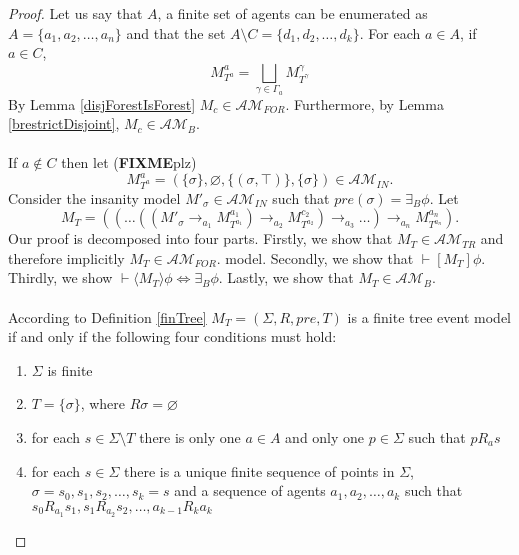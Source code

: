 \documentclass[12pt, a4paper, titlepage]{article}
\numberwithin{equation}{section}
\newcommand{\sqex}[1]{[{#1}]}
\newcommand{\anex}[1]{\langle {#1} \rangle}
\newcommand{\eventClass}{\mathcal{AM}}
\newcommand{\insaneClass}{\eventClass_{IN}}
\newcommand{\treeClass}{\eventClass_{TR}}
\newcommand{\forestClass}{\eventClass_{FOR}}
\newcommand{\FIXME}{{\bf FIXME}}
\begin{document}
\begin{proof}
Let us say that $A$, a finite set of agents can be enumerated as $A = \{ a_1, a_2, \ldots, a_n\}$
and that the set $A \setminus C = \{d_1, d_2, \ldots, d_k\}$.
For each $a \in A$, if $a \in C$,
\[
	M^a_{T^a} = \bigsqcup_{\gamma \in \Gamma_a} M^\gamma_{T^\gamma}
\]
By Lemma \ref{disjForestIsForest} $M_c \in \forestClass$.
Furthermore, by Lemma \ref{brestrictDisjoint}, $M_c \in \eventClass_B$.\\
\\
If $a \notin C$ then let (\FIXME plz)
\[
	M^a_{T^a} = (\{\sigma\}, \varnothing, \{(\sigma, \top)\}, \{\sigma\}) \in \insaneClass.
\]
Consider the insanity model $M'_\sigma \in \insaneClass$ such that $pre(\sigma) =
\exists_B \phi$.
Let
\[
M_T = ((\ldots((M'_\sigma \to_{a_1} M^{a_1}_{T^{a_1}}) \to_{a_2} M^{c_2}_{T^{a_2}}) \to_{a_3} \ldots )
		\to_{a_n} M^{a_n}_{T^{a_n}}).
\]
Our proof is decomposed into four parts.
Firstly, we show that $M_T \in \treeClass$ and therefore implicitly $M_T \in \forestClass$.
model.
Secondly, we show that $\vdash \sqex{M_T} \phi$.
Thirdly, we show $\vdash \anex{ M_T } \phi \iff \exists_B \phi$.
Lastly, we show that $M_T \in \eventClass_B$.\\
\\
According to Definition \ref{finTree} $M_T = (\Sigma, R, pre, T)$ is a finite tree event model if
and only if the following four conditions must hold:
\begin{enumerate}
	\item $\Sigma$ is finite \label{treeConFinite}
	\item $T = \{\sigma\}$, where $R \sigma = \varnothing$ \label{treeConRoot}
	\item for each $s \in \Sigma \setminus T$ there is only one $a \in A$ and only one $p \in \Sigma$
	such that $p R_a s$ \label{treeConOneAgent}
	\item for each $s \in \Sigma$ there is a unique finite sequence of points in $\Sigma$, $\sigma =
	s_0, s_1, s_2, \ldots, s_k = s$ and a sequence of agents $a_1, a_2, \ldots, a_k$ such that $s_0
	R_{a_1} s_1, s_1 R_{a_2} s_2, \ldots, a_{k-1} R_k
	a_k$ \label{treeConUniquePath}
\end{enumerate}


\end{proof}
\end{document}
